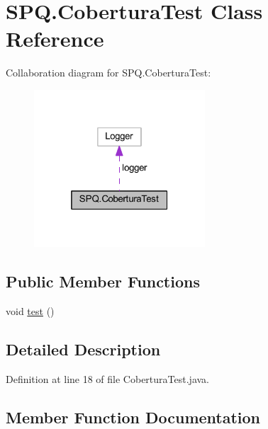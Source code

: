 \hypertarget{class_s_p_q_1_1_cobertura_test}{}\section{S\+P\+Q.\+Cobertura\+Test Class Reference}
\label{class_s_p_q_1_1_cobertura_test}


Collaboration diagram for S\+P\+Q.\+Cobertura\+Test\+:\nopagebreak
\begin{figure}[H]
\begin{center}
\leavevmode
\includegraphics[width=181pt]{class_s_p_q_1_1_cobertura_test__coll__graph}
\end{center}
\end{figure}
\subsection*{Public Member Functions}
\begin{DoxyCompactItemize}
\item 
void \mbox{\hyperlink{class_s_p_q_1_1_cobertura_test_a638bd1485fb908cc3a97cda6f4d8a857}{test}} ()
\end{DoxyCompactItemize}


\subsection{Detailed Description}


Definition at line 18 of file Cobertura\+Test.\+java.



\subsection{Member Function Documentation}
\mbox{\label{class_s_p_q_1_1_cobertura_test_a638bd1485fb908cc3a97cda6f4d8a857}} 
